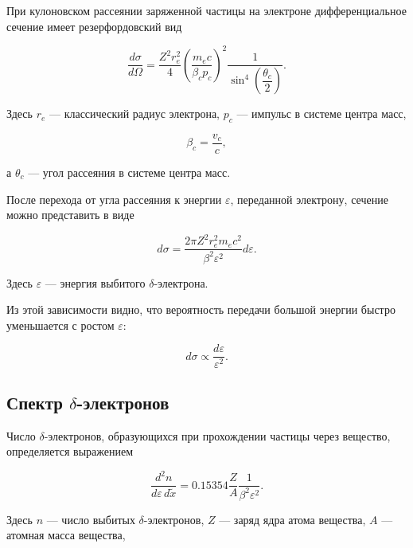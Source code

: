 \documentclass[../final.tex]{subfiles}
\begin{document}
При кулоновском рассеянии заряженной частицы на электроне
дифференциальное сечение имеет резерфордовский вид

\begin{equation*}
    \frac{d\sigma}{d\Omega}
    =
    \frac{Z^2r_e^2}{4}
    \left(
        \frac{m_ec}{\beta_c p_c}
    \right)^2
    \frac{1}{
        \sin^4
        \left(
            \dfrac{\theta_c}{2}
        \right)
    }.
\end{equation*}

Здесь $r_e$ --- классический радиус электрона,
$p_c$ --- импульс в системе центра масс,

\[
    \beta_c
    =
    \frac{v_c}{c},
\]

а $\theta_c$ --- угол рассеяния в системе центра масс.

После перехода от угла рассеяния к энергии $\varepsilon$,
переданной электрону, сечение можно представить в виде

\begin{equation*}
    d\sigma
    =
    \frac{
        2\pi Z^2 r_e^2 m_ec^2
    }{
        \beta^2\varepsilon^2
    }
    d\varepsilon.
\end{equation*}

Здесь $\varepsilon$ --- энергия выбитого $\delta$-электрона.

Из этой зависимости видно, что вероятность передачи большой энергии
быстро уменьшается с ростом $\varepsilon$:

\[
    d\sigma
    \propto
    \frac{d\varepsilon}{\varepsilon^2}.
\]


\subsection{Спектр \texorpdfstring{$\delta$}{δ}-электронов}

Число $\delta$-электронов, образующихся при прохождении частицы
через вещество, определяется выражением

\begin{equation*}
    \frac{d^2n}{
        d\varepsilon\,
        d\widetilde{x}
    }
    =
    0.15354
    \frac{Z}{A}
    \frac{1}{
        \beta^2\varepsilon^2
    }.
\end{equation*}

Здесь $n$ --- число выбитых $\delta$-электронов,
$Z$ --- заряд ядра атома вещества,
$A$ --- атомная масса вещества,
\end{document}
